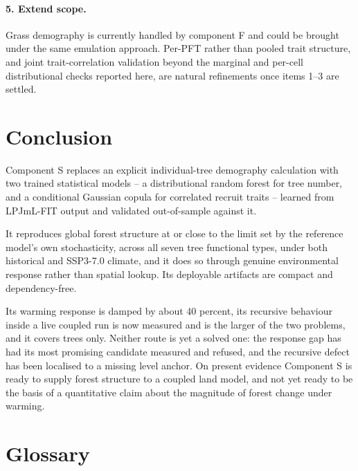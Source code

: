 \documentclass[11pt]{article}
\begin{document}
\paragraph{5. Extend scope.}
Grass demography is currently handled by component F and could be brought under the same emulation approach. Per-PFT rather than pooled trait structure, and joint trait-correlation validation beyond the marginal and per-cell distributional checks reported here, are natural refinements once items 1--3 are settled.

\section{Conclusion}

Component S replaces an explicit individual-tree demography calculation with two trained statistical models -- a distributional random forest for tree number, and a conditional Gaussian copula for correlated recruit traits -- learned from LPJmL-FIT output and validated out-of-sample against it.

It reproduces global forest structure at or close to the limit set by the reference model's own stochasticity, across all seven tree functional types, under both historical and SSP3-7.0 climate, and it does so through genuine environmental response rather than spatial lookup. Its deployable artifacts are compact and dependency-free.

Its warming response is damped by about 40 percent, its recursive behaviour inside a live coupled run is now measured and is the larger of the two problems, and it covers trees only. Neither route is yet a solved one: the response gap has had its most promising candidate measured and refused, and the recursive defect has been localised to a missing level anchor. On present evidence Component S is ready to supply forest structure to a coupled land model, and not yet ready to be the basis of a quantitative claim about the magnitude of forest change under warming.

\newpage
\section*{Glossary}
\end{document}
